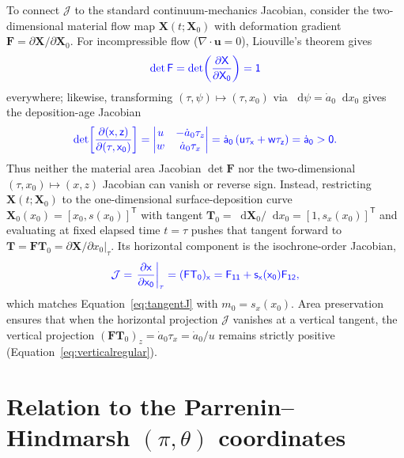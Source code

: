 \documentclass[review]{igs}
\providecommand{\DIFadd}[1]{{\protect\color{blue} \sf #1}} %
\providecommand{\DIFaddbegin}{} %
\newcommand{\DIFaddincludegraphics}[2][]{{\color{blue}\fbox{\DIFOincludegraphics[#1]{#2}}}} %
\DeclareRobustCommand{\DIFaddbegin}{\DIFOaddbegin \let\includegraphics\DIFaddincludegraphics} %
\begin{document}
\DIFaddbegin \DIFadd{To connect \(\mathcal{J}\) to the standard continuum-mechanics Jacobian, consider the two-dimensional material flow map \(\bm{X}(t;\bm{X}_0)\) with deformation gradient \(\bm{F}=\partial\bm{X}/\partial\bm{X}_0\). For incompressible flow (\(\nabla\cdot\bm{u}=0\)), Liouville's theorem gives
}\begin{equation}
\DIFadd{\det\bm{F}=\det\!\left(\frac{\partial\bm{X}}{\partial\bm{X}_0}\right)=1
}\end{equation}
\DIFadd{everywhere; likewise, transforming \((\tau,\psi)\mapsto(\tau,x_0)\) via \(\mathop{}\!\mathrm{d}\psi=\dot a_0\mathop{}\!\mathrm{d} x_0\) gives the deposition-age Jacobian
}\begin{equation}
\DIFadd{\det\!\left[\frac{\partial(x,z)}{\partial(\tau,x_0)}\right]
=\begin{vmatrix}
u & -\dot a_0\tau_z\\
w & \dot a_0\tau_x
\end{vmatrix}
=\dot a_0\left(u\tau_x+w\tau_z\right)
=\dot a_0>0.
}\end{equation}
\DIFadd{Thus neither the material area Jacobian \(\det\bm{F}\) nor the two-dimensional \((\tau,x_0)\mapsto(x,z)\) Jacobian can vanish or reverse sign. Instead, restricting \(\bm{X}(t;\bm{X}_0)\) to the one-dimensional surface-deposition curve \(\bm{X}_0(x_0)=[x_0,s(x_0)]^{\mathsf T}\) with tangent \(\bm{T}_0=\mathop{}\!\mathrm{d}\bm{X}_0/\mathop{}\!\mathrm{d} x_0=[1,s_x(x_0)]^{\mathsf T}\) and evaluating at fixed elapsed time \(t=\tau\) pushes that tangent forward to \(\bm{T}=\bm{F}\bm{T}_0=\left.\partial\bm{X}/\partial x_0\right|_{\tau}\). Its horizontal component is the isochrone-order Jacobian,
}\begin{equation}
\DIFadd{\mathcal{J}
=\left.\frac{\partial x}{\partial x_0}\right|_{\tau}
=(\bm{F}\bm{T}_0)_x
=F_{11}+s_x(x_0)F_{12},
}\end{equation}
\DIFadd{which matches Equation~\ref{eq:tangentJ} with \(m_0=s_x(x_0)\). Area preservation ensures that when the horizontal projection \(\mathcal{J}\) vanishes at a vertical tangent, the vertical projection \((\bm{F}\bm{T}_0)_z=\dot a_0\tau_x=\dot a_0/u\) remains strictly positive (Equation~\ref{eq:verticalregular}).
}

\section{Relation to the Parrenin--Hindmarsh \((\pi,\theta)\) coordinates}
\label{app:parrenin}
\end{document}
